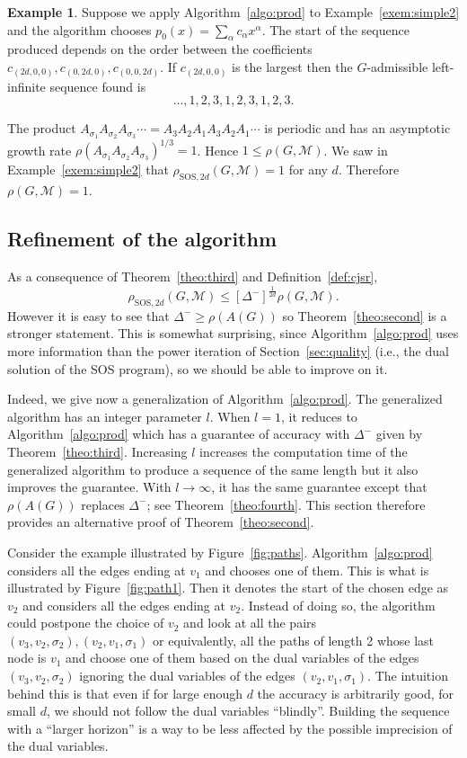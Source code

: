 \documentclass{sig-alternate-05-2015}
\newcommand{\1}{\mathbf{1}}
\newcommand{\mdin}{\Delta^{-}}
\theoremstyle{definition}
\newtheorem{myexem}{Example}
\newcommand{\A}{\mathcal{M}}
\newcommand{\G}{G}
\newcommand{\jsrsos}[1][2d]{\rho_{\mathrm{SOS},#1}(\G,\A)}
\newcommand{\cjsr}{\rho(\G,\A)}
\newcommand{\Sect}{Section~}
\newcommand{\arc}{edge}
\newcommand{\arcs}{edges}
\begin{document}
\begin{myexem}
  \label{exem:simple3}
  Suppose we apply Algorithm~\ref{algo:prod} to Example~\ref{exem:simple2}
  and the algorithm chooses $p_0(x) = \sum_\alpha c_\alpha x^\alpha$.
  The start of the sequence produced depends on the order between
  the coefficients $c_{(2d,0,0)},\allowbreak c_{(0,2d,0)},\allowbreak c_{(0,0,2d)}$.
  If $c_{(2d,0,0)}$ is the largest then
  the $\G$-admissible left-infinite sequence found is
  \[ \ldots,1,2,3,1,2,3,1,2,3. \]

  The product $A_{\sigma_1} A_{\sigma_2} A_{\sigma_3} \cdots = A_3A_2A_1A_3A_2A_1 \cdots $
  is periodic and has an asymptotic growth rate $\rho(A_{\sigma_1}A_{\sigma_2}A_{\sigma_3})^{1/3}\allowbreak = 1$.
  Hence $1 \leq \cjsr$.
  We saw in Example~\ref{exem:simple2} that $\jsrsos = 1$ for any $d$.
  Therefore $\cjsr = 1$.
\end{myexem}


\subsection{Refinement of the algorithm}
As a consequence of Theorem~\ref{theo:third} and Definition~\ref{def:cjsr},
\[ \jsrsos \leq [\mdin]^{\frac{1}{2d}} \cjsr. \]
However it is easy to see that $\mdin \geq \rho(A(\G))$ so
Theorem~\ref{theo:second} is a stronger statement.  This is somewhat
surprising, since Algorithm~\ref{algo:prod} uses more information than
the power iteration of \Sect\eqref{sec:quality} (i.e., the dual
solution of the SOS program), so we should be able to improve on it.


Indeed, we give now a generalization of Algorithm~\ref{algo:prod}.
The generalized algorithm has an integer parameter $l$.  When $l = 1$,
it reduces to Algorithm~\ref{algo:prod} which has a guarantee of
accuracy with $\mdin$ given by Theorem~\ref{theo:third}.  Increasing
$l$ increases the computation time of the generalized algorithm to
produce a sequence of the same length but it also improves the
guarantee.  With $l \to \infty$, it has the same guarantee except that
$\rho(A(G))$ replaces $\mdin$; see Theorem~\ref{theo:fourth}.
This section therefore provides an alternative proof of
Theorem~\ref{theo:second}.

Consider the example illustrated by Figure~\ref{fig:paths}.
Algorithm~\ref{algo:prod} considers all the \arcs{} ending at $v_1$ and chooses one of them.
This is what is illustrated by Figure~\ref{fig:path1}.
Then it denotes the start of the chosen \arc{} as $v_2$ and considers all the \arcs{} ending at $v_2$.
Instead of doing so, the algorithm could postpone the choice of $v_2$ and look at all the pairs $(v_3,v_2,\sigma_2),(v_2,v_1,\sigma_1)$ or equivalently, all the paths of length 2 whose last node is $v_1$ and choose one of them based on the dual variables of the edges $(v_3,v_2,\sigma_2)$ ignoring the dual variables of the edges $(v_2,v_1,\sigma_1)$.
The intuition behind this is that even if for large enough $d$ the accuracy is arbitrarily good,
for small $d$, we should not follow the dual variables ``blindly''.
Building the sequence with a ``larger horizon'' is a way to be less affected by the possible imprecision of the dual variables.
\end{document}
